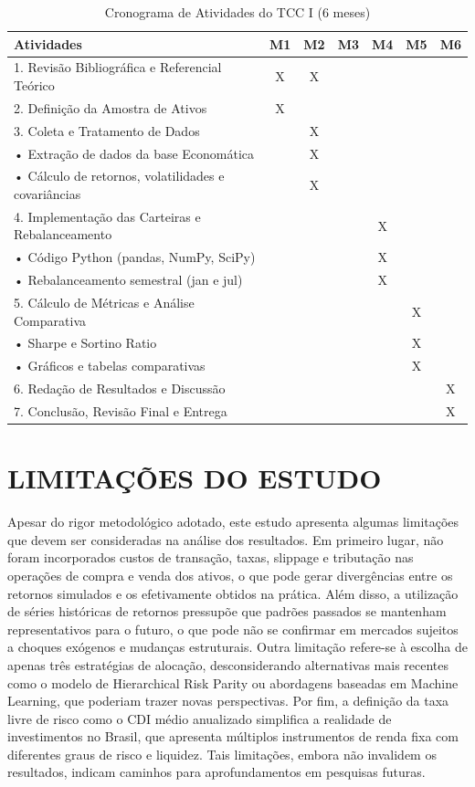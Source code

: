 \begin{table}[h]
\centering
\caption{Cronograma de Atividades do TCC I (6 meses)}
\scriptsize
\begin{tabular}{|p{4.5cm}|*{6}{c|}}
\hline
\textbf{Atividades} & \textbf{M1} & \textbf{M2} & \textbf{M3} & \textbf{M4} & \textbf{M5} & \textbf{M6} \\
\hline
1. Revisão Bibliográfica e Referencial Teórico & X & X & & & & \\
\hline
2. Definição da Amostra de Ativos & X & & & & & \\
\hline
3. Coleta e Tratamento de Dados & & X & & & & \\
\hline
\quad • Extração de dados da base Economática & & X & & & & \\
\hline
\quad • Cálculo de retornos, volatilidades e covariâncias & & X & & & & \\
\hline
4. Implementação das Carteiras e Rebalanceamento & & & & X & & \\
\hline
\quad • Código Python (pandas, NumPy, SciPy) & & & & X & & \\
\hline
\quad • Rebalanceamento semestral (jan e jul) & & & & X & & \\
\hline
5. Cálculo de Métricas e Análise Comparativa & & & & & X & \\
\hline
\quad • Sharpe e Sortino Ratio & & & & & X & \\
\hline
\quad • Gráficos e tabelas comparativas & & & & & X & \\
\hline
6. Redação de Resultados e Discussão & & & & & & X \\
\hline
7. Conclusão, Revisão Final e Entrega & & & & & & X \\
\hline
\end{tabular}
\normalsize
\label{tab:cronograma}
\end{table}

\section{LIMITAÇÕES DO ESTUDO}

Apesar do rigor metodológico adotado, este estudo apresenta algumas limitações que devem ser consideradas na análise dos resultados. Em primeiro lugar, não foram incorporados custos de transação, taxas, slippage e tributação nas operações de compra e venda dos ativos, o que pode gerar divergências entre os retornos simulados e os efetivamente obtidos na prática. Além disso, a utilização de séries históricas de retornos pressupõe que padrões passados se mantenham representativos para o futuro, o que pode não se confirmar em mercados sujeitos a choques exógenos e mudanças estruturais. Outra limitação refere-se à escolha de apenas três estratégias de alocação, desconsiderando alternativas mais recentes como o modelo de Hierarchical Risk Parity ou abordagens baseadas em Machine Learning, que poderiam trazer novas perspectivas. Por fim, a definição da taxa livre de risco como o CDI médio anualizado simplifica a realidade de investimentos no Brasil, que apresenta múltiplos instrumentos de renda fixa com diferentes graus de risco e liquidez. Tais limitações, embora não invalidem os resultados, indicam caminhos para aprofundamentos em pesquisas futuras.